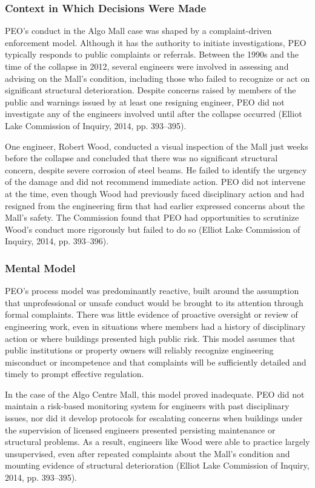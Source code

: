 \documentclass[12pt]{article}
\begin{document}
\subsubsection*{Context in Which Decisions Were Made}
PEO’s conduct in the Algo Mall case was shaped by a complaint-driven enforcement model. Although it has the authority to initiate investigations, PEO typically responds to public complaints or referrals. Between the 1990s and the time of the collapse in 2012, several engineers were involved in assessing and advising on the Mall’s condition, including those who failed to recognize or act on significant structural deterioration. Despite concerns raised by members of the public and warnings issued by at least one resigning engineer, PEO did not investigate any of the engineers involved until after the collapse occurred (Elliot Lake Commission of Inquiry, 2014, pp. 393–395).

One engineer, Robert Wood, conducted a visual inspection of the Mall just weeks before the collapse and concluded that there was no significant structural concern, despite severe corrosion of steel beams. He failed to identify the urgency of the damage and did not recommend immediate action. PEO did not intervene at the time, even though Wood had previously faced disciplinary action and had resigned from the engineering firm that had earlier expressed concerns about the Mall’s safety. The Commission found that PEO had opportunities to scrutinize Wood’s conduct more rigorously but failed to do so (Elliot Lake Commission of Inquiry, 2014, pp. 393–396).

\subsubsection*{Mental Model}
PEO’s process model was predominantly reactive, built around the assumption that unprofessional or unsafe conduct would be brought to its attention through formal complaints. There was little evidence of proactive oversight or review of engineering work, even in situations where members had a history of disciplinary action or where buildings presented high public risk. This model assumes that public institutions or property owners will reliably recognize engineering misconduct or incompetence and that complaints will be sufficiently detailed and timely to prompt effective regulation.

In the case of the Algo Centre Mall, this model proved inadequate. PEO did not maintain a risk-based monitoring system for engineers with past disciplinary issues, nor did it develop protocols for escalating concerns when buildings under the supervision of licensed engineers presented persisting maintenance or structural problems. As a result, engineers like Wood were able to practice largely unsupervised, even after repeated complaints about the Mall’s condition and mounting evidence of structural deterioration (Elliot Lake Commission of Inquiry, 2014, pp. 393–395).
\end{document}

